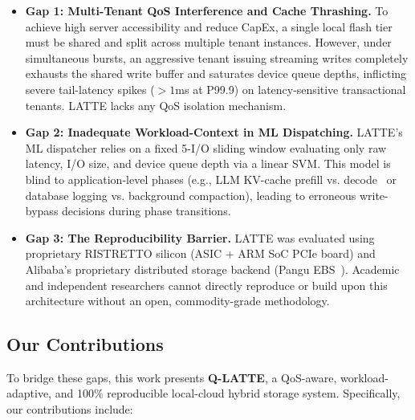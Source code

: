 \documentclass[10pt,twocolumn]{article}
\begin{document}
\begin{itemize}
    \item \textbf{Gap 1: Multi-Tenant QoS Interference and Cache Thrashing.} To achieve high server accessibility and reduce CapEx, a single local flash tier must be shared and split across multiple tenant instances. However, under simultaneous bursts, an aggressive tenant issuing streaming writes completely exhausts the shared write buffer and saturates device queue depths, inflicting severe tail-latency spikes ($>1$ms at P99.9) on latency-sensitive transactional tenants. LATTE lacks any QoS isolation mechanism.
    \item \textbf{Gap 2: Inadequate Workload-Context in ML Dispatching.} LATTE's ML dispatcher relies on a fixed 5-I/O sliding window evaluating only raw latency, I/O size, and device queue depth via a linear SVM. This model is blind to application-level phases (e.g., LLM KV-cache prefill vs. decode~\cite{wong2024baleen} or database logging vs. background compaction), leading to erroneous write-bypass decisions during phase transitions.
    \item \textbf{Gap 3: The Reproducibility Barrier.} LATTE was evaluated using proprietary RISTRETTO silicon (ASIC + ARM SoC PCIe board) and Alibaba's proprietary distributed storage backend (Pangu EBS~\cite{zhang2024ebs}). Academic and independent researchers cannot directly reproduce or build upon this architecture without an open, commodity-grade methodology.
\end{itemize}

\subsection{Our Contributions}
To bridge these gaps, this work presents \textbf{Q-LATTE}, a QoS-aware, workload-adaptive, and 100\% reproducible local-cloud hybrid storage system. Specifically, our contributions include:
\end{document}
